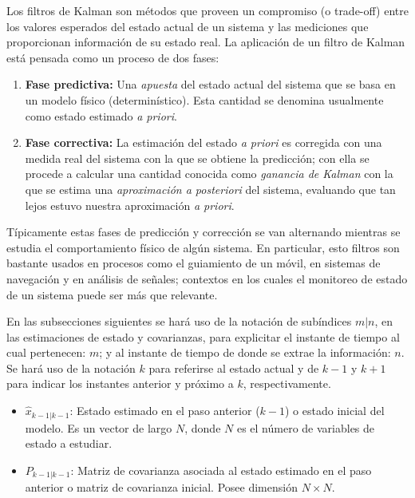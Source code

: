 Los filtros de Kalman son m\'etodos que proveen un compromiso (o trade-off) entre los valores esperados del estado actual de un sistema y las mediciones que proporcionan informaci\'on de su estado real. La aplicaci\'on de un filtro de Kalman est\'a pensada como un proceso de dos fases:
\begin{enumerate}
\item \textbf{Fase predictiva:} Una \textit{apuesta} del estado actual del sistema que se basa en un modelo f\'isico (determin\'istico). Esta cantidad se denomina usualmente como estado estimado \textit{a priori}. 
\item \textbf{Fase correctiva:} La estimaci\'on del estado \textit{a priori} es corregida con una medida real del sistema con la que se obtiene la predicci\'on; con ella se procede a calcular una cantidad conocida como \textit{ganancia de Kalman} con la que se estima una \textit{aproximaci\'on a posteriori} del sistema, evaluando que tan lejos estuvo nuestra aproximaci\'on \textit{a priori}. 
\end{enumerate}
\bigskip

T\'ipicamente estas fases de predicci\'on y correcci\'on se van alternando mientras se estudia el comportamiento f\'isico de alg\'un sistema. En particular, esto filtros son bastante usados en procesos como el guiamiento de un m\'ovil, en sistemas de navegaci\'on y en an\'alisis de se\~nales; contextos en los cuales el monitoreo de estado de un sistema puede ser m\'as que relevante.
\bigskip

En las subsecciones siguientes se har\'a uso de la notaci\'on de sub\'indices $m|n$, en las estimaciones de estado y covarianzas, para explicitar el instante de tiempo al cual pertenecen:  $m$; y al instante de tiempo de donde se extrae la informaci\'on: $n$. Se har\'a uso de la notaci\'on $k$ para referirse al estado actual y de $k-1$ y $k+1$ para indicar los instantes anterior y pr\'oximo a $k$, respectivamente.
\bigskip

\begin{itemize}
\item $\hat{x}_{k-1|k-1}$: Estado estimado en el paso anterior ($k-1$) o estado inicial del modelo. Es un vector de largo $N$, donde $N$ es el n\'umero de variables de estado a estudiar.
\item $P_{k-1|k-1}$: Matriz de covarianza asociada al estado estimado en el paso anterior o matriz de covarianza inicial. Posee dimensi\'on $N\times N$.
\end{itemize}
\bigskip

